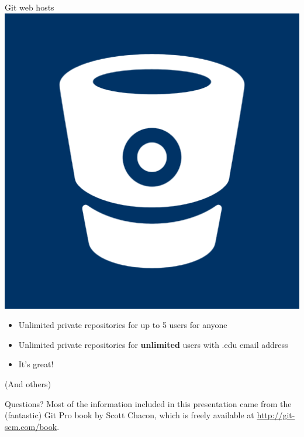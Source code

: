 \documentclass[xcolor=dvipsnames]{beamer}
\begin{document}
\begin{frame}{Git web hosts}
\vspace{5mm}
\includegraphics[scale=.03]{bitbucketlogo} \hspace{1mm}{\LARGE Bitbucket}
\begin{itemize}
\item Unlimited private repositories for up to 5 users for anyone
\item Unlimited private repositories for {\bf unlimited} users with .edu email address
\item It's great!
\end{itemize}

\vspace{3mm}
(And others)
\end{frame}

\begin{frame}{Questions?}
Most of the information included in this presentation came from the (fantastic) Git Pro book by Scott Chacon, which is freely available at \url{http://git-scm.com/book}.
\end{frame}
\end{document}
